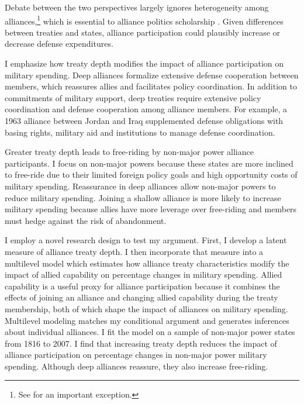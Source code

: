 \documentclass[12pt]{article}
\begin{document}
Debate between the two perspectives largely ignores heterogeneity among alliances,\footnote{See \citet{DigiuseppePoast2016} for an important exception.} which is essential to alliance politics scholarship \citep{Morrow1991, Leeds2003, LeedsAnac2005, Fordham2010, Mattes2012, Benson2012, Poast2013, Johnsonetal2015}.  
Given differences between treaties and states, alliance participation could plausibly increase or decrease defense expenditures. 


I emphasize how treaty depth modifies the impact of alliance participation on military spending. 
Deep alliances formalize extensive defense cooperation between members, which reassures allies and facilitates policy coordination. 
In addition to commitments of military support, deep treaties require extensive policy coordination and defense cooperation among alliance members. 
For example, a 1963 alliance between Jordan and Iraq supplemented defense obligations with basing rights, military aid and institutions to manage defense coordination. 


Greater treaty depth leads to free-riding by non-major power alliance participants. 
I focus on non-major powers because these states are more inclined to free-ride due to their limited foreign policy goals and high opportunity costs of military spending. 
Reassurance in deep alliances allow non-major powers to reduce military spending. 
Joining a shallow alliance is more likely to increase military spending because allies have more leverage over free-riding and members must hedge against the risk of abandonment.  
 

I employ a novel research design to test my argument.
First, I develop a latent measure of alliance treaty depth. 
I then incorporate that measure into a multilevel model which estimates how alliance treaty characteristics modify the impact of allied capability on percentage changes in military spending.
Allied capability is a useful proxy for alliance participation because it combines the effects of joining an alliance and changing allied capability during the treaty membership, both of which shape the impact of alliances on military spending. 
Multilevel modeling matches my conditional argument and generates inferences about individual alliances. 
I fit the model on a sample of non-major power states from 1816 to 2007. 
I find that increasing treaty depth reduces the impact of alliance participation on percentage changes in non-major power military spending.
Although deep alliances reassure, they also increase free-riding. 
\end{document}
